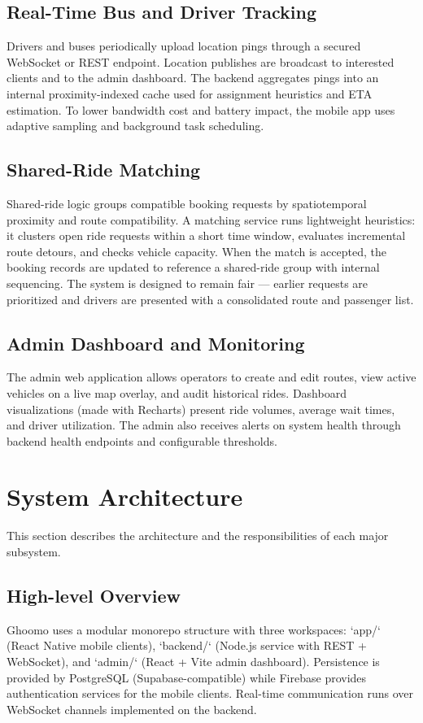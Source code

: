 \documentclass[12pt,a4paper]{article}
\begin{document}
\subsection{Real-Time Bus and Driver Tracking}
Drivers and buses periodically upload location pings through a secured WebSocket or REST endpoint. Location publishes are broadcast to interested clients and to the admin dashboard. The backend aggregates pings into an internal proximity-indexed cache used for assignment heuristics and ETA estimation. To lower bandwidth cost and battery impact, the mobile app uses adaptive sampling and background task scheduling.

\subsection{Shared-Ride Matching}
Shared-ride logic groups compatible booking requests by spatiotemporal proximity and route compatibility. A matching service runs lightweight heuristics: it clusters open ride requests within a short time window, evaluates incremental route detours, and checks vehicle capacity. When the match is accepted, the booking records are updated to reference a shared-ride group with internal sequencing. The system is designed to remain fair — earlier requests are prioritized and drivers are presented with a consolidated route and passenger list.

\subsection{Admin Dashboard and Monitoring}
The admin web application allows operators to create and edit routes, view active vehicles on a live map overlay, and audit historical rides. Dashboard visualizations (made with Recharts) present ride volumes, average wait times, and driver utilization. The admin also receives alerts on system health through backend health endpoints and configurable thresholds.

\section{System Architecture}
This section describes the architecture and the responsibilities of each major subsystem.

\subsection{High-level Overview}
Ghoomo uses a modular monorepo structure with three workspaces: `app/` (React Native mobile clients), `backend/` (Node.js service with REST + WebSocket), and `admin/` (React + Vite admin dashboard). Persistence is provided by PostgreSQL (Supabase-compatible) while Firebase provides authentication services for the mobile clients. Real-time communication runs over WebSocket channels implemented on the backend.
\end{document}
